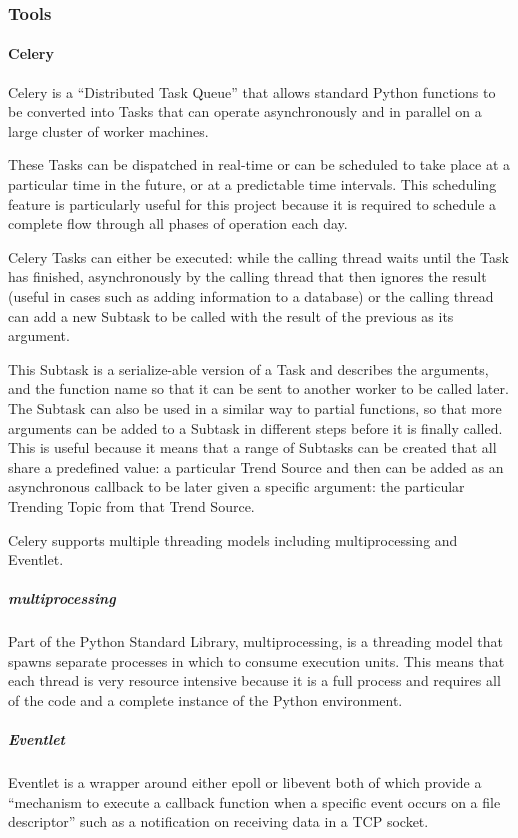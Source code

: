 \subsubsection{Tools}
\paragraph{Celery}
Celery is a ``Distributed Task Queue'' that allows standard Python functions to be converted into Tasks that can operate asynchronously and in parallel on a large cluster of worker machines.

These Tasks can be dispatched in real-time or can be scheduled to take place at a particular time in the future, or at a predictable time intervals.  This scheduling feature is particularly useful for this project because it is required to schedule a complete flow through all phases of operation each day.

Celery Tasks can either be executed: while the calling thread waits until the Task has finished,  asynchronously by the calling thread that then ignores the result (useful in cases such as adding information to a database) or the calling thread can add a new Subtask to be called with the result of the previous as its argument.

This Subtask is a serialize-able version of a Task and describes the arguments, and the function name so that it can be sent to another worker to be called later.  The Subtask can also be used in a similar way to partial functions, so that more arguments can be added to a Subtask in different steps before it is finally called.  This is useful because it means that a range of Subtasks can be created that all share a predefined value: a particular Trend Source and then can be added as an asynchronous callback to be later given a specific argument: the particular Trending Topic from that Trend Source.

Celery supports multiple threading models including multiprocessing and Eventlet.
\subparagraph{multiprocessing}
Part of the Python Standard Library, multiprocessing, is a threading model that spawns separate processes in which to consume execution units.  This means that each thread is very resource intensive because it is a full process and requires all of the code and a complete instance of the Python environment.

\subparagraph{Eventlet}
Eventlet is a wrapper around either epoll or libevent both of which provide a ``mechanism to execute a callback function when a specific event occurs on a file descriptor'' such as a notification on receiving data in a TCP socket. 

